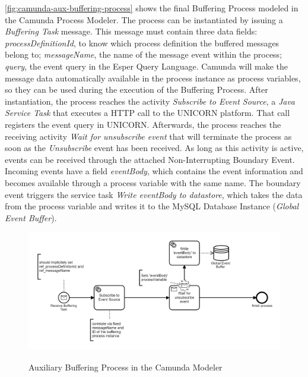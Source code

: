 \autoref{fig:camunda-aux-buffering-process} shows the final Buffering Process modeled in the Camunda Process Modeler. The process can be instantiated by issuing a \textit{Buffering Task} message. This message must contain three data fields: \textit{processDefinitionId}, to know which process definition the buffered messages belong to; \textit{messageName}, the name of the message event within the process; \textit{query}, the event query in the Esper Query Language.
Camunda will make the message data automatically available in the process instance as process variables, so they can be used during the execution of the Buffering Process.
After instantiation, the process reaches the activity \textit{Subscribe to Event Source}, a \textit{Java Service Task} that executes a HTTP call to the UNICORN platform. That call registers the event query in UNICORN. 
Afterwards, the process reaches the receiving activity \textit{Wait for unsubscribe event} that will terminate the process as soon as the \textit{Unsubscribe} event has been received.
As long as this activity is active, events can be received through the attached Non-Interrupting Boundary Event. Incoming events have a field \textit{eventBody}, which contains the event information and becomes available through a process variable with the same name. 
The boundary event triggers the service task \textit{Write eventBody to datastore}, which takes the data from the process variable and writes it to the MySQL Database Instance (\textit{Global Event Buffer}).

\begin{figure}[]
	\myfloatalign
	{\includegraphics[width=1\linewidth]{chapters/assessment/buffering-process.PNG}}
	\caption{Auxiliary Buffering Process in the Camunda Modeler}\label{fig:camunda-aux-buffering-process}
\end{figure}

